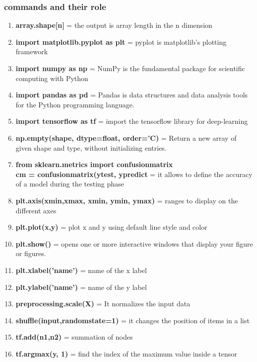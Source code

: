 \documentclass[11pt]{article}
\begin{document}
\clearpage
\subsubsection{commands and their role}
 \begin{multicols}{2}
\begin{enumerate}
\item \textbf{array.shape[n]} = the output is  array length in the n dimension
\item \textbf{import matplotlib.pyplot as plt} =  pyplot is matplotlib's plotting framework
\item \textbf{import numpy as np} =  NumPy is the fundamental package for scientific computing with Python 
\item \textbf{import pandas as pd} =  Pandas is data structures and data analysis tools for the Python programming language.
\item \textbf{import tensorflow as tf} =  import the tensorflow library 
for deep-learning 
\item \textbf{np.empty(shape, dtype=float, order='C)} = Return a new array of given shape and type, without initializing entries.
\item \textbf{from sklearn.metrics import confusion\textunderscore matrix \\ cm = confusion\textunderscore matrix(y\textunderscore test,   y\textunderscore predict } = it allows to define the accuracy of a model during the testing phase
\item \textbf{plt.axis(x\textunderscore min,x\textunderscore max, x\textunderscore min, y\textunderscore min, y\textunderscore max)} = ranges to display on the different axes
\item \textbf{plt.plot(x,y)} = plot x and y using default line style and color
\item \textbf{plt.show()} = opens one or more interactive windows that display your figure or figures.
\item \textbf{plt.xlabel('name')} = name of the x label
\item \textbf{plt.ylabel('name')} = name of the y label
\item \textbf{preprocessing.scale(X)} = It normalizes the input data 
\item \textbf{shuffle(input,random\textunderscore state=1)} =  it changes the position of items in a list
\item \textbf{tf.add(n1,n2)} = summation  of nodes
\item \textbf{tf.argmax(y, 1)} = find the index of the maximum value inside a tensor

\end{enumerate}
\end{multicols}
\end{document}
